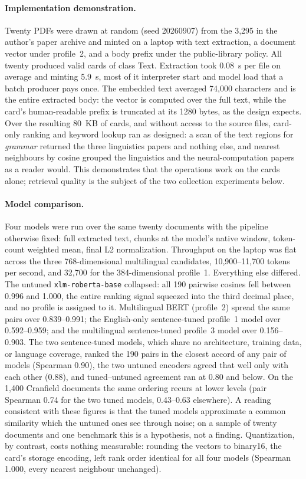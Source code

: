 \documentclass[sigconf]{acmart}
\begin{document}
\paragraph{Implementation demonstration.} Twenty PDFs were drawn at random
(seed 20260907) from the 3,295 in the author's paper archive and minted on a
laptop with text extraction, a document vector under profile~2, and a body
prefix under the public-library policy. All twenty produced valid cards of
class Text. Extraction took 0.08~s per file on average and minting 5.9~s,
most of it interpreter start and model load that a batch producer pays once.
The embedded text averaged 74,000 characters and is the entire extracted
body: the vector is computed over the full text, while the card's
human-readable prefix is truncated at its 1280 bytes, as the design expects.
Over the resulting 80~KB of cards, and without access to the source files,
card-only ranking and keyword lookup ran as designed: a scan of the text
regions for \emph{grammar} returned the three linguistics papers and nothing
else, and nearest neighbours by cosine grouped the linguistics and the
neural-computation papers as a reader would. This demonstrates that the
operations work on the cards alone; retrieval quality is the subject of the
two collection experiments below.

\paragraph{Model comparison.} Four models were run over the same twenty
documents with the pipeline otherwise fixed: full extracted text, chunks at
the model's native window, token-count weighted mean, final L2
normalization. Throughput on the laptop was flat across the three
768-dimensional multilingual candidates, 10,900--11,700 tokens per second,
and 32,700 for the 384-dimensional profile~1. Everything else differed. The
untuned \texttt{xlm-roberta-base} collapsed: all 190 pairwise cosines fell
between 0.996 and 1.000, the entire ranking signal squeezed into the third
decimal place, and no profile is assigned to it. Multilingual BERT
(profile~2) spread the same pairs over 0.839--0.991; the English-only
sentence-tuned profile~1 model over 0.592--0.959; and the multilingual
sentence-tuned profile~3 model over 0.156--0.903. The two sentence-tuned
models, which share no architecture, training data, or language coverage,
ranked the 190 pairs in the closest accord of any pair of models (Spearman
0.90), the two untuned encoders agreed that well only with each other (0.88),
and tuned--untuned agreement ran at 0.80 and below. On the 1,400 Cranfield
documents the same ordering recurs at lower levels (pair Spearman 0.74 for
the two tuned models, 0.43--0.63 elsewhere). A reading consistent with these
figures is that the tuned models approximate a common similarity which the
untuned ones see through noise; on a sample of twenty documents and one
benchmark this is a hypothesis, not a finding. Quantization, by contrast,
costs nothing measurable: rounding the vectors to binary16, the card's
storage encoding, left rank order identical for all four models (Spearman
1.000, every nearest neighbour unchanged).
\end{document}
